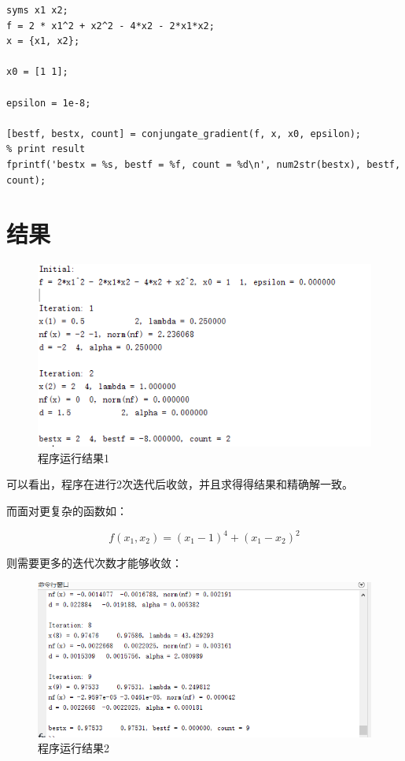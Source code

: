 \documentclass[10pt, a4paper,UTF8]{article}
\begin{document}
\begin{lstlisting}
syms x1 x2;
f = 2 * x1^2 + x2^2 - 4*x2 - 2*x1*x2;
x = {x1, x2};

x0 = [1 1];

epsilon = 1e-8;

[bestf, bestx, count] = conjungate_gradient(f, x, x0, epsilon);
% print result
fprintf('bestx = %s, bestf = %f, count = %d\n', num2str(bestx), bestf, count);
\end{lstlisting}


\section{结果}

\begin{figure}[H]
	\centering
	\includegraphics{rs.PNG}        %
    \caption{程序运行结果1}
    \label{fig2}
\end{figure}

可以看出，程序在进行2次迭代后收敛，并且求得得结果和精确解一致。
\par
而面对更复杂的函数如：


 $$   f(x_1,x_2) = (x_1-1)^4 + (x_1 - x_2)^2 $$

 则需要更多的迭代次数才能够收敛：

 \begin{figure}[H]
	\centering
	\includegraphics[scale=0.8]{rs2.PNG}        %
    \caption{程序运行结果2}
    \label{fig2}
\end{figure}
\end{document}
